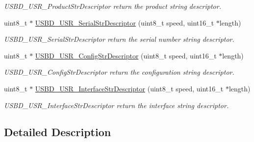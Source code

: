 \begin{DoxyCompactItemize}
\begin{DoxyCompactList}\small\item\em U\-S\-B\-D\-\_\-\-U\-S\-R\-\_\-\-Product\-Str\-Descriptor return the product string descriptor. \end{DoxyCompactList}\item 
uint8\-\_\-t $\ast$ \hyperlink{group__USBD__DESC__Exported__FunctionsPrototype_ga61caa6dd47de36f32d25e2d6980e5904}{U\-S\-B\-D\-\_\-\-U\-S\-R\-\_\-\-Serial\-Str\-Descriptor} (uint8\-\_\-t speed, uint16\-\_\-t $\ast$length)
\begin{DoxyCompactList}\small\item\em U\-S\-B\-D\-\_\-\-U\-S\-R\-\_\-\-Serial\-Str\-Descriptor return the serial number string descriptor. \end{DoxyCompactList}\item 
uint8\-\_\-t $\ast$ \hyperlink{group__USBD__DESC__Exported__FunctionsPrototype_ga1a95bda8d761cd993c82234e043270fc}{U\-S\-B\-D\-\_\-\-U\-S\-R\-\_\-\-Config\-Str\-Descriptor} (uint8\-\_\-t speed, uint16\-\_\-t $\ast$length)
\begin{DoxyCompactList}\small\item\em U\-S\-B\-D\-\_\-\-U\-S\-R\-\_\-\-Config\-Str\-Descriptor return the configuration string descriptor. \end{DoxyCompactList}\item 
uint8\-\_\-t $\ast$ \hyperlink{group__USBD__DESC__Exported__FunctionsPrototype_gaf7003c494f598dd781416da3e468e615}{U\-S\-B\-D\-\_\-\-U\-S\-R\-\_\-\-Interface\-Str\-Descriptor} (uint8\-\_\-t speed, uint16\-\_\-t $\ast$length)
\begin{DoxyCompactList}\small\item\em U\-S\-B\-D\-\_\-\-U\-S\-R\-\_\-\-Interface\-Str\-Descriptor return the interface string descriptor. \end{DoxyCompactList}\end{DoxyCompactItemize}


\subsection{Detailed Description}


